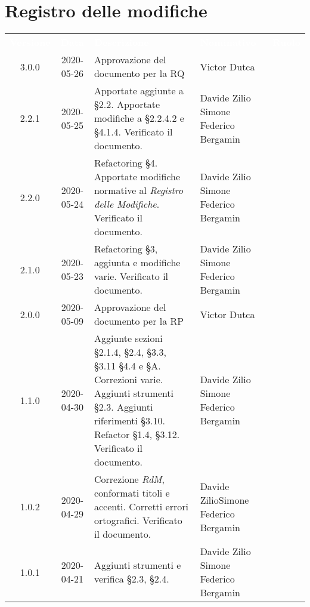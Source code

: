 \section*{Registro delle modifiche}
{
	\centering
	\begin{longtable}{ c c  C{4cm}  C{3.8cm}  C{3cm} }
		\textcolor{white}{\textbf{Versione}} & \textcolor{white}{\textbf{Data}} & \textcolor{white}{\textbf{Descrizione}} & \textcolor{white}{\textbf{Nominativo}} & \textcolor{white}{\textbf{Ruolo}}\\
		3.0.0 & 2020-05-26 & Approvazione del documento per la RQ & Victor Dutca &\Res{}\\
		2.2.1 & 2020-05-25 & Apportate aggiunte a \S 2.2. Apportate modifiche a \S 2.2.4.2 e \S 4.1.4. Verificato il documento. & Davide Zilio \newline Simone Federico Bergamin & \adm{} \newline  \ver{} \\
		2.2.0 & 2020-05-24 & Refactoring \S 4. Apportate modifiche normative al \textit{Registro delle Modifiche}. Verificato il documento. & Davide Zilio \newline Simone Federico Bergamin & \adm{} \newline  \ver{} \\
	2.1.0 & 2020-05-23 & Refactoring \S 3, aggiunta e modifiche varie. Verificato il documento. & Davide Zilio \newline Simone Federico Bergamin & \adm{} \newline  \ver{} \\
	2.0.0 & 2020-05-09 & Approvazione del documento per la RP & Victor Dutca &\Res{}\\
	1.1.0 & 2020-04-30 & Aggiunte sezioni \S 2.1.4, \S 2.4, \S 3.3, \S 3.11 \S 4.4 e \S A. Correzioni varie. Aggiunti strumenti \S 2.3. Aggiunti riferimenti \S 3.10. Refactor \S 1.4, \S 3.12. Verificato il documento. & Davide Zilio \newline Simone Federico Bergamin&\adm{} \newline  \ver{}\\
	1.0.2 & 2020-04-29 & Correzione \textit{RdM}, conformati titoli e accenti. Corretti errori ortografici. Verificato il documento. & Davide Zilio\newline Simone Federico Bergamin &\adm{} \newline  \ver{}\\
	1.0.1 & 2020-04-21 & Aggiunti strumenti e verifica \S 2.3, \S 2.4. & Davide Zilio \newline Simone Federico Bergamin &\adm{} \newline  \ver{}\\	

\end{longtable}}
